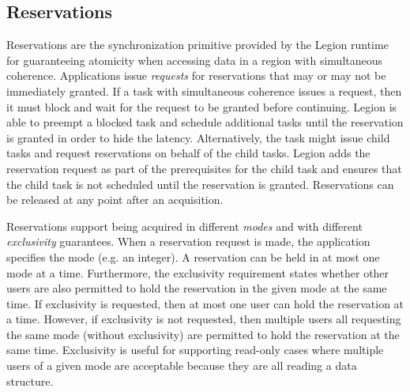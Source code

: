 \subsection{Reservations}
\label{subsec:reservations}
Reservations are the synchronization primitive provided 
by the Legion runtime for guaranteeing atomicity when 
accessing data in a region with simultaneous coherence.
Applications issue {\em requests} for reservations
that may or may not be immediately granted. If a task
with simultaneous coherence issues a request, then 
it must block and wait for the request to be granted
before continuing. Legion is able to preempt
a blocked task and schedule additional tasks until the
reservation is granted in order to hide the latency.
Alternatively, the task might issue child tasks and
request reservations on behalf of the child tasks.
Legion adds the reservation request as part of the 
prerequisites for the child task and ensures that 
the child task is not scheduled until the reservation
is granted. Reservations can be released at any point
after an acquisition.

Reservations support being acquired in different 
{\em modes} and with different {\em exclusivity} guarantees.
When a reservation request is made, the application
specifies the mode (e.g. an integer). A reservation
can be held in at most one mode at a time. Furthermore,
the exclusivity requirement states whether other users
are also permitted to hold the reservation in the given
mode at the same time. If exclusivity is requested,
then at most one user can hold the reservation at a
time. However, if exclusivity is not requested, 
then multiple users all requesting the same mode
(without exclusivity) are permitted to hold the
reservation at the same time. Exclusivity is useful
for supporting read-only cases where multiple users
of a given mode are acceptable because they are all
reading a data structure.

